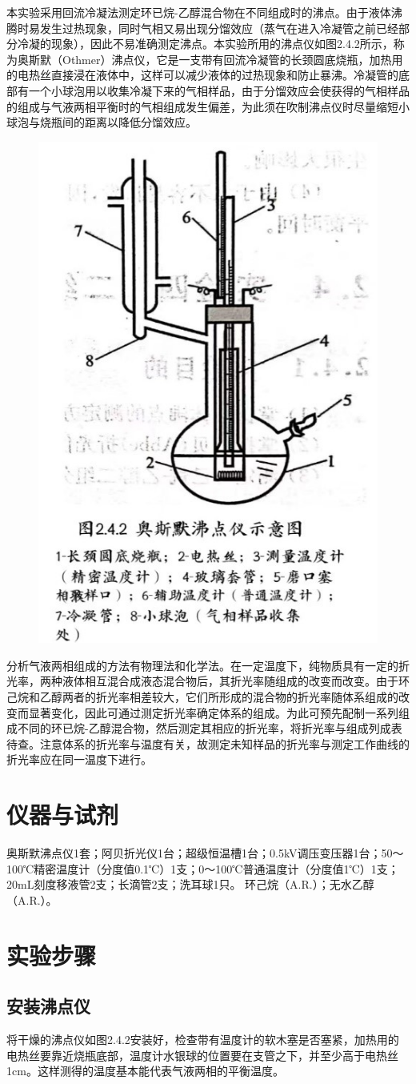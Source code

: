 \documentclass[12pt,hyperref,a4paper,UTF8]{ctexart}
\begin{document}
本实验采用回流冷凝法测定环已烷-乙醇混合物在不同组成时的沸点。由于液体沸腾时易发生过热现象，同时气相又易出现分馏效应（蒸气在进入冷凝管之前已经部分冷凝的现象），因此不易准确测定沸点。本实验所用的沸点仪如图2.4.2所示，称为奥斯默（Othmer）沸点仪，它是一支带有回流冷凝管的长颈圆底烧瓶，加热用的电热丝直接浸在液体中，这样可以减少液体的过热现象和防止暴沸。冷凝管的底部有一个小球泡用以收集冷凝下来的气相样品，由于分馏效应会使获得的气相样品的组成与气液两相平衡时的气相组成发生偏差，为此须在吹制沸点仪时尽量缩短小球泡与烧瓶间的距离以降低分馏效应。
\begin{figure}[H]
    \centering
    \includegraphics[width=0.25\linewidth]{2.jpg}
    \label{fig:enter-label}
\end{figure}

分析气液两相组成的方法有物理法和化学法。在一定温度下，纯物质具有一定的折光率，两种液体相互混合成液态混合物后，其折光率随组成的改变而改变。由于环己烷和乙醇两者的折光率相差较大，它们所形成的混合物的折光率随体系组成的改变而显著变化，因此可通过测定折光率确定体系的组成。为此可预先配制一系列组成不同的环已烷-乙醇混合物，然后测定其相应的折光率，将折光率与组成列成表待查。注意体系的折光率与温度有关，故测定未知样品的折光率与测定工作曲线的折光率应在同一温度下进行。
\section{仪器与试剂}
奥斯默沸点仪1套；阿贝折光仪1台；超级恒温槽1台；0.5kV调压变压器1台；50～100℃精密温度计（分度值0.1℃）1支；0～100℃普通温度计（分度值1℃）1支；20mL刻度移液管2支；长滴管2支；洗耳球1只。
环己烷（A.R.）；无水乙醇（A.R.）。

\section{实验步骤}
\subsection{安装沸点仪}
将干燥的沸点仪如图2.4.2安装好，检查带有温度计的软木塞是否塞紧，加热用的电热丝要靠近烧瓶底部，温度计水银球的位置要在支管之下，并至少高于电热丝1cm。这样测得的温度基本能代表气液两相的平衡温度。
\end{document}
